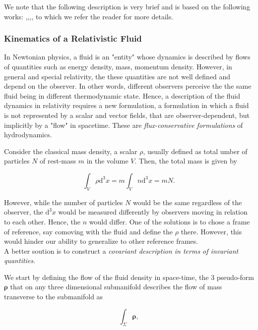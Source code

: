 \documentclass[11pt,a4paper,headinclude=true,DIV=14,BCOR=8mm,chapterprefix,listof=totoc,twoside,openright,abstracton]{scrbook}
\begin{document}
We note that the following description is very brief and is based on the following works: \cite{Misner:1973},\cite{Schutz:2009a},\cite{Gourgoulhon:2006bn},\cite{Andersson:2006nr},\cite{Rezzolla:2013} to which we refer the reader for more details.  

\subsubsection{Kinematics of a Relativistic Fluid}

In Newtonian physics, a fluid is an "entity" whose dynamics is described by flows of quantities such as energy density, mass, momentum density. However, in general and special relativity, the these quantities are not well defined and depend on the observer. In other words, different observers perceive the the same fluid being in different thermodynamic state. Hence, a description of the fluid dynamics in relativity requires a new formulation, a formulation in which a fluid is not represented by a scalar and vector fields, that are observer-dependent, but implicitly by a "flow" in spacetime. These are \textit{flux-conservative formulations} of hydrodynamics.

Consider the classical mass density, a scalar $\rho$, usually defined as total umber of particles $N$ of rest-mass $m$ in the volume $V$. Then, the total mass is given by

\begin{equation}
    \int_V \rho \text{d}^3x = m\int_V n \text{d}^3 x = mN.
\end{equation}

However, while the number of particles $N$ would be the same regardless of the observer, the $\text{d}^3x$ would be measured differently by observers moving in relation to each other. Hence, the $n$ would differ. One of the solutions is to chose a frame of reference, say comoving with the fluid and define the $\rho$ there. However, this would hinder our ability to generalize to other reference frames.\\ A better soution is to construct a \textit{covariant description in terms of invariant quantities}. 
 
We start by defining the flow of the fluid density in space-time, the 3 pseudo-form $\boldsymbol{\rho}$ that on any three dimensional submanifold describes the flow of mass transverse to the submanifold as

\begin{equation}
    \int_{\Sigma} \boldsymbol{\rho},
\end{equation}
\end{document}
